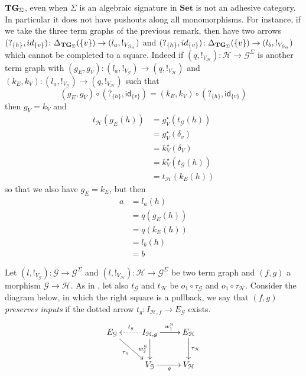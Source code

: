 \documentclass[runningheads,envcountsect]{lipics-v2021}
\newcommand{\Set}{\mathbf{Set}}
\newcommand{\catname}[1]{\textbf{\textup{#1}}}
\newcommand{\tg}[0]{\catname{TG}_{\Sigma}}
\newcommand{\id}[1]{\mathsf{id}_{#1}}
\begin{document}
\begin{remark}
	$\tg$, even when $\Sigma$ is an algebraic signature in $\Set$ is not an adhesive category. In particular it does not have pushouts along all monomorphisms. For instance, if we take the three term graphs of the previous remark, then have two arrows
	$(?_{\{h\}}, \id{\{v\}})\colon \Delta_{\tg}(\{v\})\to (l_a, !_{V_{\mathcal{G}_a}})$ and $(?_{\{h\}}, \id{\{v\}})\colon \Delta_{\tg}(\{v\})\to (l_b, !_{V_{\mathcal{G}_a}})$ which cannot be completed to a square. Indeed if $(q, !_{V_\mathcal{H}})\colon \mathcal{H}\to \mathcal{G}^\Sigma$ is another term graph with $(g_E, g_V)\colon (l_a, !_{V_{\mathcal{G}}})\to (q, !_{V_\mathcal{H}})$ and $(k_E, k_V)\colon (l_a, !_{V_{\mathcal{G}}})\to (q, !_{V_\mathcal{H}})$  such that 
	\[(g_E, g_V)\circ (?_{\{h\}}, \id{\{v\}}) = (k_E, k_V)\circ (?_{\{h\}}, \id{\{v\}})\]
	then $g_V=k_V$ and
	\begin{align*}t_{\mathcal{H}}(g_E(h))&=g^\star_V(t_{\mathcal{G}}(h))\\&=g_V^\star(\delta_v)\\&=k^\star_V(\delta_V)\\&=k^\star_V(t_{\mathcal{G}}(h))\\&=t_{\mathcal{H}}(k_E(h))
	\end{align*}
	so that we also have $g_E=k_E$, but then
	\begin{align*}
		a&=l_a(h)\\&=q(g_E(h))\\&=q(k_E(h))\\&=l_b(h)\\&=b
	\end{align*}
\end{remark}


\begin{definition}
	Let $(l, !_{V_{\mathcal{G}}})\colon \mathcal{G}\to \mathcal{G}^{\Sigma}$ and $(l, !_{V_{\mathcal{H}}})\colon \mathcal{H}\to \mathcal{G}^{\Sigma}$ be two term graph and $(f,g)$ a morphism $\mathcal{G}\to \mathcal{H}$. As in , let also $t_{\mathcal{G}}$ and $t_{\mathcal{H}}$ be $o_{1}\circ \tau_\mathcal{G}$ and $o_1\circ \tau_{\mathcal{H}}$. Consider the diagram below, in which the right square is a pullback, we say that $(f,g)$ \emph{preserves inputs} if the dotted arrow  $t_g\colon I_{\mathcal{{H}}, f}\to E_{\mathcal{{G}}}$ exists.
	\[\xymatrix{E_{\mathcal{G}} \ar[dr]_{\tau_{\mathcal{G}}}&I_{\mathcal{H}, g} \ar@{.>}[l]_{t_g} \ar[r]^{w^{\mathcal{G}}_1} \ar[d]_{w^{\mathcal{G}}_2} & E_{\mathcal{H}} \ar[d]^{\tau_{\mathcal{H}}}\\ & V_{\mathcal{G}} \ar[r]_{g}  & V_{\mathcal{{H}}}}\]
	
	
\end{definition}
\end{document}
